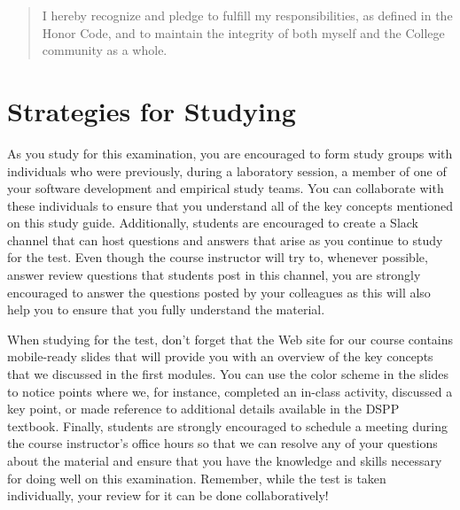 \vspace*{-.11in}
\begin{quote}
  I hereby recognize and pledge to fulfill my responsibilities, as defined in the Honor Code, and to maintain the
  integrity of both myself and the College community as a whole.
\end{quote}
\vspace*{-.11in}

\vspace*{-.2in}
\section*{Strategies for Studying}
\vspace*{-.1in}

As you study for this examination, you are encouraged to form study groups with individuals who were previously, during
a laboratory session, a member of one of your software development and empirical study teams. You can collaborate with
these individuals to ensure that you understand all of the key concepts mentioned on this study guide. Additionally,
students are encouraged to create a Slack channel that can host questions and answers that arise as you continue to
study for the test.  Even though the course instructor will try to, whenever possible, answer review questions that
students post in this channel, you are strongly encouraged to answer the questions posted by your colleagues as this
will also help you to ensure that you fully understand the material.

When studying for the test, don't forget that the Web site for our course contains mobile-ready slides that will provide
you with an overview of the key concepts that we discussed in the first modules. You can use the color scheme in the
slides to notice points where we, for instance, completed an in-class activity, discussed a key point, or made reference
to additional details available in the DSPP textbook. Finally, students are strongly encouraged to schedule a meeting
during the course instructor's office hours so that we can resolve any of your questions about the material and ensure
that you have the knowledge and skills necessary for doing well on this examination. Remember, while the test is taken
individually, your review for it can be done collaboratively!


